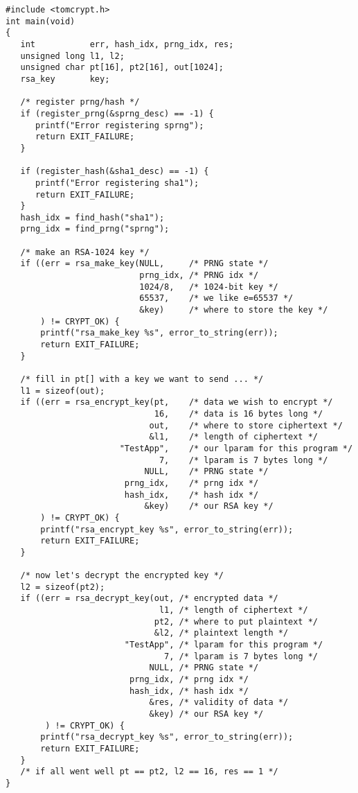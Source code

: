 \documentclass[a4paper]{book}
\begin{document}
\begin{verbatim}
#include <tomcrypt.h>
int main(void)
{
   int           err, hash_idx, prng_idx, res;
   unsigned long l1, l2;
   unsigned char pt[16], pt2[16], out[1024];
   rsa_key       key;

   /* register prng/hash */
   if (register_prng(&sprng_desc) == -1) {
      printf("Error registering sprng");
      return EXIT_FAILURE;
   }

   if (register_hash(&sha1_desc) == -1) {
      printf("Error registering sha1");
      return EXIT_FAILURE;
   }
   hash_idx = find_hash("sha1");
   prng_idx = find_prng("sprng");

   /* make an RSA-1024 key */
   if ((err = rsa_make_key(NULL,     /* PRNG state */
                           prng_idx, /* PRNG idx */
                           1024/8,   /* 1024-bit key */
                           65537,    /* we like e=65537 */
                           &key)     /* where to store the key */
       ) != CRYPT_OK) {
       printf("rsa_make_key %s", error_to_string(err));
       return EXIT_FAILURE;
   }

   /* fill in pt[] with a key we want to send ... */
   l1 = sizeof(out);
   if ((err = rsa_encrypt_key(pt,    /* data we wish to encrypt */
                              16,    /* data is 16 bytes long */
                             out,    /* where to store ciphertext */
                             &l1,    /* length of ciphertext */
                       "TestApp",    /* our lparam for this program */
                               7,    /* lparam is 7 bytes long */
                            NULL,    /* PRNG state */
                        prng_idx,    /* prng idx */
                        hash_idx,    /* hash idx */
                            &key)    /* our RSA key */
       ) != CRYPT_OK) {
       printf("rsa_encrypt_key %s", error_to_string(err));
       return EXIT_FAILURE;
   }

   /* now let's decrypt the encrypted key */
   l2 = sizeof(pt2);
   if ((err = rsa_decrypt_key(out, /* encrypted data */
                               l1, /* length of ciphertext */
                              pt2, /* where to put plaintext */
                              &l2, /* plaintext length */
                        "TestApp", /* lparam for this program */
                                7, /* lparam is 7 bytes long */
                             NULL, /* PRNG state */
                         prng_idx, /* prng idx */
                         hash_idx, /* hash idx */
                             &res, /* validity of data */
                             &key) /* our RSA key */ 
        ) != CRYPT_OK) {
       printf("rsa_decrypt_key %s", error_to_string(err));
       return EXIT_FAILURE;
   }
   /* if all went well pt == pt2, l2 == 16, res == 1 */
}
\end{verbatim}
\end{document}
